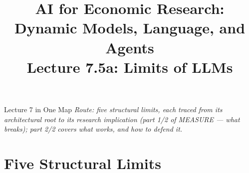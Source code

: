 



\graphicspath{{./pic/}{../../MiniCourse_8hr/Slides/Module3_LLM_Text/pic/}{../}}

\usetikzlibrary{arrows.meta, positioning, shapes.geometric, fit, backgrounds}



\title[AI for Econ Research]{AI for Economic Research: Dynamic Models, Language, and Agents\\
Lecture 7.5a: Limits of LLMs}



\makebeamertitle

\begin{frame}{Lecture 7 in One Map}
\medskip
\textit{\footnotesize Route: five structural limits, each traced from its architectural root to its research implication (part 1/2 of MEASURE --- what breaks); part 2/2 covers what works, and how to defend it.}
\end{frame}

\section{Five Structural Limits}

